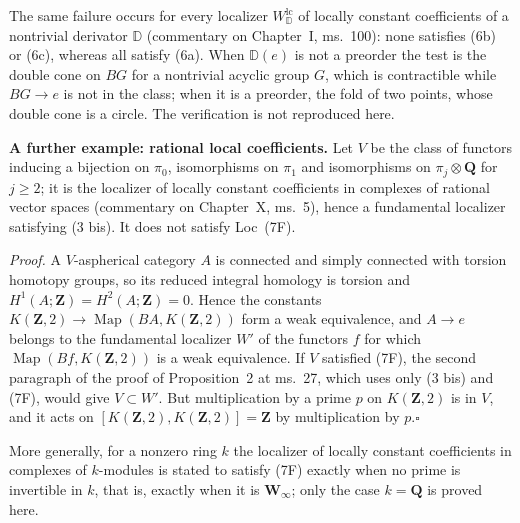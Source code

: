 The same failure occurs for every localizer $W^{\mathrm{lc}}_{\mathbb D}$ of locally constant coefficients of a nontrivial derivator $\mathbb D$ (commentary on Chapter~I, ms.~100): none satisfies (6b) or (6c), whereas all satisfy (6a). When $\mathbb D(e)$ is not a preorder the test is the double cone on $BG$ for a nontrivial acyclic group $G$, which is contractible while $BG\to e$ is not in the class; when it is a preorder, the fold of two points, whose double cone is a circle. The verification is not reproduced here.

\textbf{A further example: rational local coefficients.}\ours
Let $V$ be the class of functors inducing a bijection on $\pi_0$, isomorphisms on $\pi_1$ and isomorphisms on $\pi_j\otimes\mathbf Q$ for $j\geq2$; it is the localizer of locally constant coefficients in complexes of rational vector spaces (commentary on Chapter~X, ms.~5), hence a fundamental localizer satisfying (3 bis). It does not satisfy Loc~(7F).

\textit{Proof.} A $V$-aspherical category $A$ is connected and simply connected with torsion homotopy groups, so its reduced integral homology is torsion and $H^1(A;\mathbf Z)=H^2(A;\mathbf Z)=0$. Hence the constants $K(\mathbf Z,2)\to\operatorname{Map}(BA,K(\mathbf Z,2))$ form a weak equivalence, and $A\to e$ belongs to the fundamental localizer $W'$ of the functors $f$ for which $\operatorname{Map}(Bf,K(\mathbf Z,2))$ is a weak equivalence. If $V$ satisfied (7F), the second paragraph of the proof of Proposition~2 at ms.~27, which uses only (3 bis) and (7F), would give $V\subset W'$. But multiplication by a prime $p$ on $K(\mathbf Z,2)$ is in $V$, and it acts on $[K(\mathbf Z,2),K(\mathbf Z,2)]=\mathbf Z$ by multiplication by $p$.\hfill$\square$

More generally, for a nonzero ring $k$ the localizer of locally constant coefficients in complexes of $k$-modules is stated to satisfy (7F) exactly when no prime is invertible in $k$, that is, exactly when it is $\mathbf W_\infty$; only the case $k=\mathbf Q$ is proved here.
